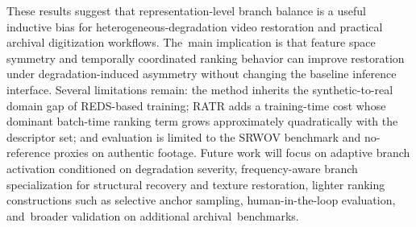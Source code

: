\documentclass[symmetry,article,accept,pdftex,moreauthors]{Definitions/mdpi}
\begin{document}
These results suggest that representation-level branch balance is a useful inductive bias for heterogeneous-degradation video restoration and practical archival digitization workflows. The~main implication is that feature space symmetry and temporally coordinated ranking behavior can improve restoration under degradation-induced asymmetry without changing the baseline inference interface. Several limitations remain: the method inherits the synthetic-to-real domain gap of REDS-based training; RATR adds a training-time cost whose dominant batch-time ranking term grows approximately quadratically with the descriptor set; and evaluation is limited to the SRWOV benchmark and no-reference proxies on authentic footage. Future work will focus on adaptive branch activation conditioned on degradation severity, frequency-aware branch specialization for structural recovery and texture restoration, lighter ranking constructions such as selective anchor sampling, human-in-the-loop evaluation, and~broader validation on additional archival~benchmarks.


\vspace{6pt}





\end{document}
